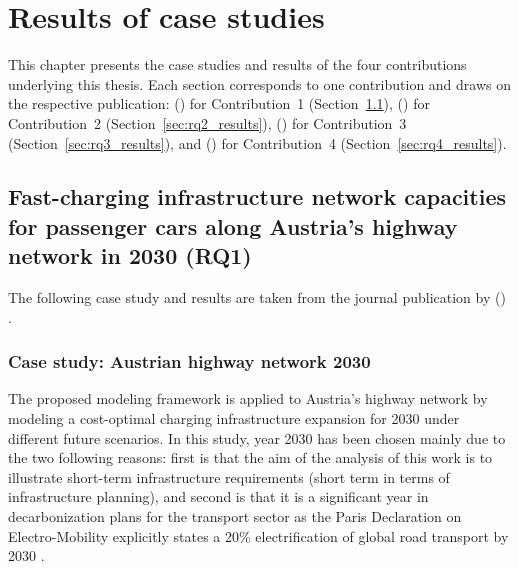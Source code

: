 \chapter{Results of case studies}\label{ch:results}

This chapter presents the case studies and results of the four contributions underlying this thesis. Each section corresponds to one contribution and draws on the respective publication: \citeauthor{en15062147} (\citeyear{en15062147}) \cite{en15062147} for Contribution~1 (Section~\ref{sec:rq1_results}), \citeauthor{GOLAB2026PublicCharger} (\citeyear{GOLAB2026PublicCharger}) \cite{GOLAB2026PublicCharger} for Contribution~2 (Section~\ref{sec:rq2_results}), \citeauthor{GOLAB2026SpatialTruck} (\citeyear{GOLAB2026SpatialTruck}) \cite{GOLAB2026SpatialTruck} for Contribution~3 (Section~\ref{sec:rq3_results}), and \citeauthor{GOLAB2025134385} (\citeyear{GOLAB2025134385}) \cite{GOLAB2025134385} for Contribution~4 (Section~\ref{sec:rq4_results}).

\section{Fast-charging infrastructure network capacities for
passenger cars along Austria’s highway network in
2030 (RQ1)}\label{sec:rq1_results}

The following case study and results are taken from the journal publication by \citeauthor{en15062147} (\citeyear{en15062147}) \cite{en15062147}.

\subsection{Case study: Austrian highway network 2030}
    The proposed modeling framework is applied to Austria's highway network by modeling a cost-optimal charging infrastructure expansion for 2030 under different future scenarios. In this study, year 2030 has been chosen mainly due to the two following reasons: first is that the aim of the analysis of this work is to illustrate short-term infrastructure requirements (short term in terms of infrastructure planning), and second is that it is a significant year in decarbonization plans for the transport sector as the Paris Declaration on Electro-Mobility explicitly states a 20\% electrification of global road transport by 2030 \citep{paris}.   
    
